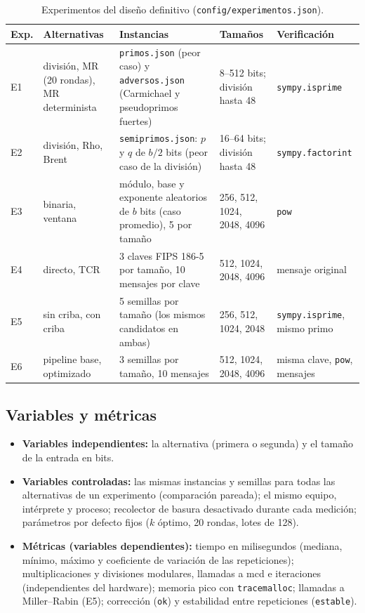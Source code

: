 \begin{table}[H]
\centering
\caption{Experimentos del diseño definitivo (\texttt{config/experimentos.json}).}
\label{tab:diseno}
\scriptsize
\renewcommand{\arraystretch}{1.25}
\begin{tabularx}{\linewidth}{@{}l R{2.3cm} R{3.2cm} R{3.0cm} Y@{}}
\toprule
\textbf{Exp.} & \textbf{Alternativas} & \textbf{Instancias} & \textbf{Tamaños} & \textbf{Verificación}\\
\midrule
E1 & división, MR (20 rondas), MR determinista & \texttt{primos.json} (peor caso) y \texttt{adversos.json} (Carmichael y pseudoprimos fuertes) & 8--512 bits; división hasta 48 & \texttt{sympy.isprime}\\
E2 & división, Rho, Brent & \texttt{semiprimos.json}: $p$ y $q$ de $b/2$ bits (peor caso de la división) & 16--64 bits; división hasta 48 & \texttt{sympy.factorint}\\
E3 & binaria, ventana & módulo, base y exponente aleatorios de $b$ bits (caso promedio), 5 por tamaño & 256, 512, 1024, 2048, 4096 & \texttt{pow}\\
E4 & directo, TCR & 3 claves FIPS 186-5 por tamaño, 10 mensajes por clave & 512, 1024, 2048, 4096 & mensaje original\\
E5 & sin criba, con criba & 5 semillas por tamaño (los mismos candidatos en ambas) & 256, 512, 1024, 2048 & \texttt{sympy.isprime}, mismo primo\\
E6 & pipeline base, optimizado & 3 semillas por tamaño, 10 mensajes & 512, 1024, 2048, 4096 & misma clave, \texttt{pow}, mensajes\\
\bottomrule
\end{tabularx}
\end{table}

\subsection{Variables y métricas}

\begin{itemize}
  \item \textbf{Variables independientes:} la alternativa (primera o segunda) y el tamaño de la entrada en bits.
  \item \textbf{Variables controladas:} las mismas instancias y semillas para todas las alternativas de
        un experimento (comparación pareada); el mismo equipo, intérprete y proceso; recolector de
        basura desactivado durante cada medición; parámetros por defecto fijos ($k$ óptimo, 20
        rondas, lotes de 128).
  \item \textbf{Métricas (variables dependientes):} tiempo en milisegundos (mediana, mínimo, máximo y
        coeficiente de variación de las repeticiones); multiplicaciones y divisiones modulares,
        llamadas a mcd e iteraciones (independientes del hardware); memoria pico con
        \texttt{tracemalloc}; llamadas a Miller--Rabin (E5); corrección (\texttt{ok}) y estabilidad
        entre repeticiones (\texttt{estable}).
\end{itemize}

